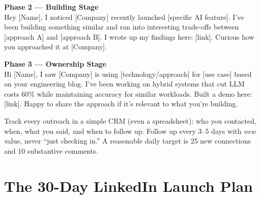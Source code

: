 \begin{template}
\textbf{Phase 2 --- Building Stage}\\[4pt]
Hey [Name], I noticed [Company] recently launched [specific AI feature]. I've been building something similar and
ran into interesting trade-offs between [approach A] and [approach B]. I wrote up my findings here: [link].
Curious how you approached it at [Company].
\end{template}

\begin{template}
\textbf{Phase 3 --- Ownership Stage}\\[4pt]
Hi [Name], I saw [Company] is using [technology/approach] for [use case] based on your engineering blog. I've been
working on hybrid systems that cut LLM costs 60\% while maintaining accuracy for similar workloads. Built a demo
here: [link]. Happy to share the approach if it's relevant to what you're building.
\end{template}

\begin{keytakeaway}
Track every outreach in a simple CRM (even a spreadsheet): who you contacted, when, what you said, and when to
follow up. Follow up every 3--5 days with \emph{new} value, never ``just checking in.'' A reasonable daily target
is 25 new connections and 10 substantive comments.
\end{keytakeaway}

\section{The 30-Day LinkedIn Launch Plan}

